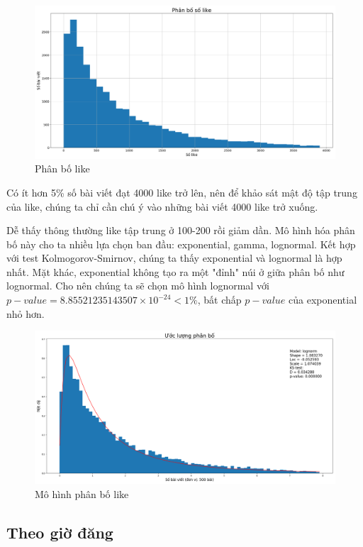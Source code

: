 \documentclass[10pt,a4paper]{article}
\begin{document}
\begin{figure}[!hb]
    \centering
    \includegraphics[width=\textwidth]{img/LikesDistribution.png}
    \caption{Phân bố like}
    \label{fig:likesdistribution}
\end{figure}
Có ít hơn 5\% số bài viết đạt 4000 like trở lên, nên để khảo sát mật độ tập trung của like, chúng ta chỉ cần chú ý vào những bài viết 4000 like trở xuống.

Dễ thấy thông thường like tập trung ở 100-200 rồi giảm dần. Mô hình hóa phân bố này cho ta nhiều lựa chọn ban đầu: exponential, gamma, lognormal. Kết hợp với test Kolmogorov-Smirnov, chúng ta thấy exponential và lognormal là hợp nhất. Mặt khác, exponential không tạo ra một "đỉnh" núi ở giữa phân bố như lognormal. Cho nên chúng ta sẽ chọn mô hình lognormal với $p-value = 8.85521235143507 \times 10^{-24} < 1\%$, bất chấp $p-value$ của exponential nhỏ hơn.
\begin{figure}[!ht]
    \centering
    \includegraphics[width=\textwidth]{img/FitLikesDistribution.png}
    \caption{Mô hình phân bố like}
    \label{fig:fitlikesdistribution}
\end{figure}

\subsection{Theo giờ đăng}
\end{document}
